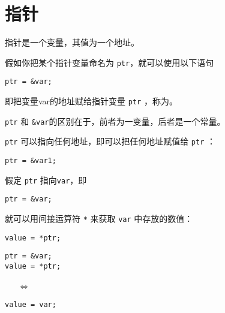 \section{指针}
\begin{frame}[fragile]\ft{\secname}
指针是一个变量，其值为一个地址。
\end{frame}

\begin{frame}[fragile]\ft{\secname}
假如你把某个指针变量命名为 \lstinline|ptr|，就可以使用以下语句
\begin{lstlisting}[backgroundcolor=\color{blue!10}]
ptr = &var;
\end{lstlisting}
即把变量{\tf var}的地址赋给指针变量 \lstinline|ptr| ，称为。
\pause \vspace{0.1in}

 \lstinline|ptr| 和 \lstinline|&var|的区别在于，前者为一变量，后者是一个常量。
\end{frame}

\begin{frame}[fragile]\ft{\secname}
 \lstinline|ptr| 可以指向任何地址，即可以把任何地址赋值给 \lstinline|ptr| ：
\begin{lstlisting}[backgroundcolor=\color{blue!10}]
ptr = &var1;
\end{lstlisting}
\end{frame}


\begin{frame}[fragile]
假定 \lstinline|ptr| 指向\lstinline|var|，即
\begin{lstlisting}[backgroundcolor=\color{blue!10}]
ptr = &var;
\end{lstlisting}
就可以用间接运算符 \lstinline|*| 来获取 \lstinline|var| 中存放的数值：
\begin{lstlisting}[backgroundcolor=\color{blue!10}]
value = *ptr;
\end{lstlisting}
\pause \vspace{0.1in}

\begin{minipage}{0.4\textwidth}
\begin{lstlisting}[backgroundcolor=\color{blue!10}]
ptr = &var;
value = *ptr;
\end{lstlisting}
\end{minipage}
~~~$\Longleftrightarrow$~~~
\begin{minipage}{0.4\textwidth}
\begin{lstlisting}[backgroundcolor=\color{blue!10}]
value = var;
\end{lstlisting}
\end{minipage}
\end{frame}

